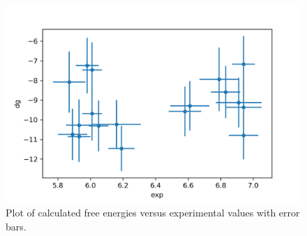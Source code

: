 \documentclass{article}
\begin{document}
\begin{figure}
  \includegraphics{dna-mmpbsa}
  \caption{Plot of calculated free energies versus experimental values with error bars.}
  \label{fig:mmpbsa}
\end{figure}
\end{document}

